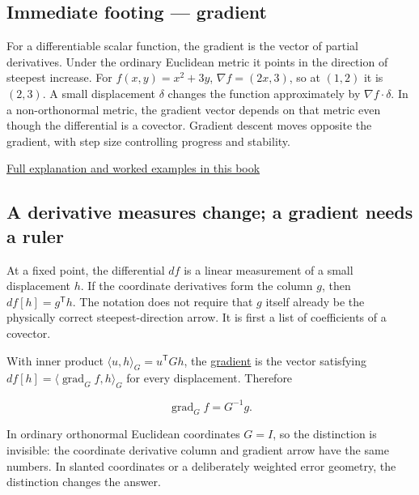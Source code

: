 \subsection{Immediate footing --- gradient}\label{01-foundations-i-ch018-immediate-footing-gradient}

\hypertarget{01-foundations-i-ch018-immediate-footing-gradient}{}

For a differentiable scalar function, the gradient is the vector of partial derivatives. Under the ordinary Euclidean metric it points in the direction of steepest increase. For \(f(x,y)=x^2+3y\), \(\nabla f=(2x,3)\), so at \((1,2)\) it is \((2,3)\). A small displacement \(\delta\) changes the function approximately by \(\nabla f\cdot\delta\). In a non-orthonormal metric, the gradient vector depends on that metric even though the differential is a covector. Gradient descent moves opposite the gradient, with step size controlling progress and stability.

\hyperref[02-foundations-ii-ch021-multivariable-derivatives-and-sensitivity-1]{Full explanation and worked examples in this book}

\subsection{A derivative measures change; a gradient needs a ruler}\label{01-foundations-i-ch018-a-derivative-measures-change-a-gradient-needs-a-ruler}

\hypertarget{01-foundations-i-ch018-a-derivative-measures-change-a-gradient-needs-a-ruler}{}

At a fixed point, the differential \(df\) is a linear measurement of a small displacement \(h\). If the coordinate derivatives form the column \(g\), then \(df[h]=g^{\mathsf T}h\). The notation does not require that \(g\) itself already be the physically correct steepest-direction arrow. It is first a list of coefficients of a covector.

With inner product \(\langle u,h\rangle_G=u^{\mathsf T}Gh\), the \hyperref[appendix-f4acdb1d5563]{gradient} is the vector satisfying \(df[h]=\langle\operatorname{grad}_G f,h\rangle_G\) for every displacement. Therefore

\[
\operatorname{grad}_G f=G^{-1}g.
\]

In ordinary orthonormal Euclidean coordinates \(G=I\), so the distinction is invisible: the coordinate derivative column and gradient arrow have the same numbers. In slanted coordinates or a deliberately weighted error geometry, the distinction changes the answer.

